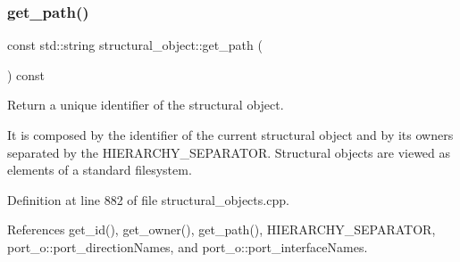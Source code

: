 \subsubsection{\texorpdfstring{get\+\_\+path()}{get\_path()}}
{\footnotesize\ttfamily const std\+::string structural\+\_\+object\+::get\+\_\+path (\begin{DoxyParamCaption}{ }\end{DoxyParamCaption}) const}



Return a unique identifier of the structural object. 

It is composed by the identifier of the current structural object and by its owners separated by the H\+I\+E\+R\+A\+R\+C\+H\+Y\+\_\+\+S\+E\+P\+A\+R\+A\+T\+OR. Structural objects are viewed as elements of a standard filesystem. 

Definition at line 882 of file structural\+\_\+objects.\+cpp.



References get\+\_\+id(), get\+\_\+owner(), get\+\_\+path(), H\+I\+E\+R\+A\+R\+C\+H\+Y\+\_\+\+S\+E\+P\+A\+R\+A\+T\+OR, port\+\_\+o\+::port\+\_\+direction\+Names, and port\+\_\+o\+::port\+\_\+interface\+Names.




